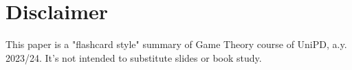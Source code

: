\documentclass{article}
\begin{document}
\tableofcontents

\newpage
{} 

\section*{Disclaimer}
This paper is a "flashcard style" summary of Game Theory course of UniPD, a.y. 2023/24. It's not intended to substitute slides or book study.


\newpage

\newpage

\newpage

\newpage

\newpage

\newpage

\newpage

\newpage


\newpage

\newpage

\newpage

\newpage

\newpage


\newpage




\end{document}
